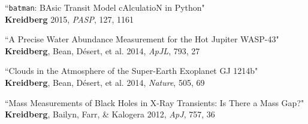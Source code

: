 \documentclass[12pt,letterpaper]{article}
\begin{document}
\begin{compactenum}
\item ``\texttt{batman}: BAsic Transit Model cAlculatioN in Python"\\
\textbf{Kreidberg} 2015, \textit{PASP}, 127, 1161 

\item ``A Precise Water Abundance Measurement for the Hot Jupiter WASP-43"\\
\textbf{Kreidberg}, Bean, D\'esert, et al. 2014, \textit{ApJL}, 793, 27

\item ``Clouds in the Atmosphere of the Super-Earth Exoplanet GJ 1214b"\\
\textbf{Kreidberg}, Bean, D\'esert, et al. 2014, \textit{Nature}, 505, 69

\item ``Mass Measurements of Black Holes in X-Ray Transients:  Is There a Mass Gap?"\\
\textbf{Kreidberg}, Bailyn, Farr, \& Kalogera 2012, \textit{ApJ}, 757, 36
\end{compactenum}
\end{document}
